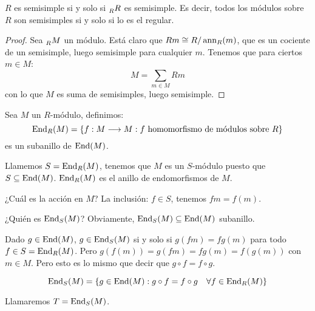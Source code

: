 \begin{teo}
  \(R\) es semisimple si y solo si \(\prescript{}{R}{R}\) es semisimple.
  Es decir, todos los módulos sobre \(R\) son semisimples si y solo si lo
  es el regular.
\end{teo}
\begin{proof}
  Sea \(\prescript{}{R}{M}\) un módulo.
  Está claro que \(Rm\cong R/\operatorname{ann}_R(m)\), que es un cociente de un semisimple,
  luego semisimple para cualquier \(m\). Tenemos que para ciertos \(m\in M\):
  \[
    M=\sum_{m\in M} Rm
  \]
  con lo que \(M\) es suma de semisimples, luego semisimple.

\end{proof}

\begin{df}
  Sea \(M\) un \(R\)-módulo, definimos:
  \[
    \operatorname{End}_R(M)=\{f:M\longrightarrow M:
    f\textrm{ homomorfismo de módulos sobre }R\}
  \]
  es un subanillo de \(\operatorname{End}(M)\).

  Llamemos \(S=\operatorname{End}_R(M)\), tenemos que \(M\) es un \(S\)-módulo puesto que
  \(S\subseteq \operatorname{End}(M)\). \(\operatorname{End}_R(M)\) es el anillo de endomorfismos de
  \(M\).

  ¿Cuál es la acción en \(M\)? La inclusión: \(f\in S\), tenemos
  \(fm=f(m)\).
\end{df}
\begin{df}[Biendomorfismos]
  ¿Quién es \(\operatorname{End}_S(M)\)?
  Obviamente, \(\operatorname{End}_S(M)\subseteq\operatorname{End}(M)\) subanillo.

  Dado \(g\in\operatorname{End}(M)\), \(g\in \operatorname{End}_S(M)\) si y solo si \(g(fm)=fg(m)\) para
  todo \(f\in S=\operatorname{End}_R(M)\). Pero \(g(f(m))=g(fm)=fg(m)=f(g(m))\) con
  \(m\in M\). Pero esto es lo mismo que decir que \(g\circ f=f\circ g\).

  \[
    \operatorname{End}_S(M)=\{g\in\operatorname{End}(M):g\circ f=f\circ g \quad\forall f\in\operatorname{End}_R(M)\}
  \]

  Llamaremos \(T=\operatorname{End}_S(M)\).
\end{df}

